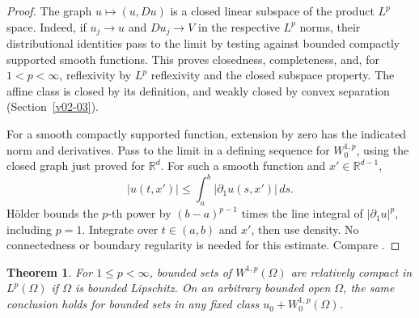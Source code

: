\documentclass[11pt,oneside,openany]{book}
\newcommand{\R}{\mathbb R}
\theoremstyle{plain}
\newtheorem{theorem}{Theorem}[chapter]
\theoremstyle{definition}
\theoremstyle{remark}
\begin{document}
\begin{proof}
The graph \(u\mapsto(u,Du)\) is a closed linear subspace of the
product \(L^p\) space. Indeed, if \(u_j\to u\) and \(Du_j\to V\)
in the respective \(L^p\) norms, their distributional identities
pass to the limit by testing against bounded compactly supported
smooth functions. This proves closedness, completeness, and, for
\(1<p<\infty\), reflexivity by \(L^p\) reflexivity and the closed
subspace property. The affine class is closed by its definition,
and weakly closed by convex separation
(Section~\ref{v02-03}).

For a smooth compactly supported function, extension by zero has
the indicated norm and derivatives. Pass to the limit in a defining
sequence for \(W^{1,p}_0\), using the closed graph just proved for
\(\R^d\). For such a smooth function and \(x'\in\R^{d-1}\),
\[
 \lvert u(t,x')\rvert
 \le \int_a^b \lvert\partial_1u(s,x')\rvert\,ds .
\]
H\"older bounds the \(p\)-th power by \((b-a)^{p-1}\) times the
line integral of \(\lvert\partial_1u\rvert^p\), including \(p=1\).
Integrate over \(t\in(a,b)\) and \(x'\), then use density. No
connectedness or boundary regularity is needed for this estimate.
Compare \cite[Theorem 1.51]{Dacorogna}.
\end{proof}

\begin{theorem}\label{thm:sobolev-compact-affine}
For \(1\le p<\infty\), bounded sets of \(W^{1,p}(\Omega)\) are
relatively compact in \(L^p(\Omega)\) if \(\Omega\) is bounded
Lipschitz. On an arbitrary bounded open \(\Omega\), the same
conclusion holds for bounded sets in any fixed class
\(u_0+W^{1,p}_0(\Omega)\).
\end{theorem}
\end{document}
